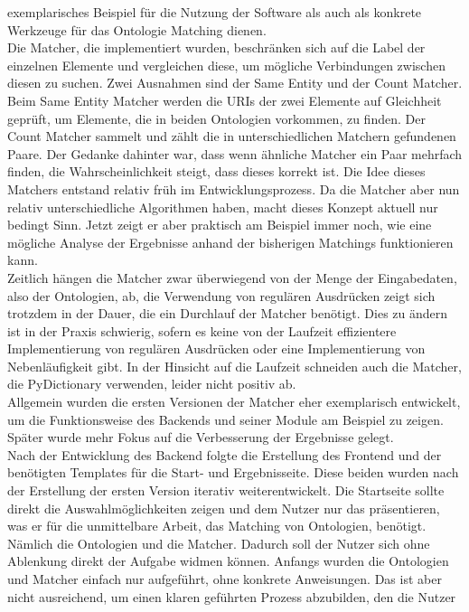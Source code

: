 exemplarisches Beispiel für die Nutzung der Software als auch als konkrete
Werkzeuge für das Ontologie Matching dienen.\\
Die Matcher, die implementiert wurden, beschränken sich auf die Label der
einzelnen Elemente und vergleichen diese, um mögliche Verbindungen zwischen
diesen zu suchen. Zwei Ausnahmen sind der Same Entity und der Count Matcher.
Beim Same Entity Matcher werden die URIs der zwei Elemente auf Gleichheit
geprüft, um Elemente, die in beiden Ontologien vorkommen, zu finden. Der Count
Matcher sammelt und zählt die in unterschiedlichen Matchern gefundenen Paare. 
Der Gedanke dahinter war, dass wenn ähnliche Matcher ein Paar mehrfach finden,
die Wahrscheinlichkeit steigt, dass dieses korrekt ist. Die Idee dieses
Matchers entstand relativ früh im Entwicklungsprozess. Da die Matcher aber nun
relativ unterschiedliche Algorithmen haben, macht dieses Konzept aktuell nur
bedingt Sinn. Jetzt zeigt er aber praktisch am Beispiel immer noch, wie eine
mögliche Analyse der Ergebnisse anhand der bisherigen Matchings funktionieren kann.\\
Zeitlich hängen die Matcher zwar überwiegend von der Menge
der Eingabedaten, also der Ontologien, ab, die Verwendung von regulären Ausdrücken
zeigt sich trotzdem in der Dauer, die ein Durchlauf der Matcher benötigt. Dies
zu ändern ist in der Praxis schwierig, sofern es keine von der Laufzeit
effizientere Implementierung von regulären Ausdrücken oder eine Implementierung
von Nebenläufigkeit gibt.
In der Hinsicht auf die Laufzeit
schneiden auch die Matcher, die PyDictionary verwenden, leider nicht
positiv ab.\\
Allgemein wurden die ersten Versionen der Matcher eher exemplarisch
entwickelt, um die Funktionsweise des Backends und seiner Module am Beispiel zu
zeigen. Später wurde mehr Fokus auf die Verbesserung der Ergebnisse gelegt.\\
Nach der Entwicklung des Backend folgte die Erstellung des Frontend und der
benötigten Templates für die Start- und Ergebnisseite. Diese beiden wurden nach
der Erstellung der ersten Version iterativ weiterentwickelt. Die Startseite
sollte direkt die Auswahlmöglichkeiten zeigen und dem Nutzer nur das
präsentieren, was er für die unmittelbare Arbeit, das Matching von Ontologien,
benötigt. Nämlich die Ontologien und die Matcher. Dadurch soll der Nutzer sich
ohne Ablenkung direkt der Aufgabe widmen können. Anfangs wurden die Ontologien
und Matcher einfach nur aufgeführt, ohne konkrete Anweisungen. Das ist aber
nicht ausreichend, um einen klaren geführten Prozess abzubilden, den die Nutzer
